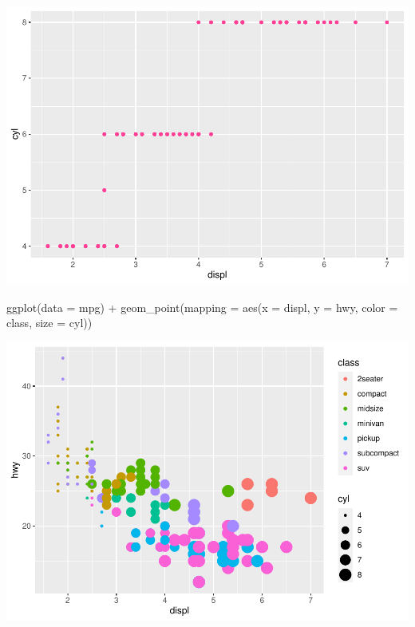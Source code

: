\documentclass[
]{article}
\newenvironment{Shaded}{\begin{snugshade}}{\end{snugshade}}
\newcommand{\AttributeTok}[1]{\textcolor[rgb]{0.77,0.63,0.00}{#1}}
\newcommand{\FunctionTok}[1]{\textcolor[rgb]{0.00,0.00,0.00}{#1}}
\newcommand{\NormalTok}[1]{#1}
\newcommand{\SpecialCharTok}[1]{\textcolor[rgb]{0.00,0.00,0.00}{#1}}
\begin{document}
\includegraphics{2_9_LiveCoding_files/figure-latex/unnamed-chunk-5-1.pdf}

\begin{Shaded}
\begin{Highlighting}[]
\FunctionTok{ggplot}\NormalTok{(}\AttributeTok{data =}\NormalTok{ mpg) }\SpecialCharTok{+} 
  \FunctionTok{geom\_point}\NormalTok{(}\AttributeTok{mapping =} \FunctionTok{aes}\NormalTok{(}\AttributeTok{x =}\NormalTok{ displ, }\AttributeTok{y =}\NormalTok{ hwy, }\AttributeTok{color =}\NormalTok{ class, }\AttributeTok{size =}\NormalTok{ cyl)) }
\end{Highlighting}
\end{Shaded}

\includegraphics{2_9_LiveCoding_files/figure-latex/unnamed-chunk-6-1.pdf}
\end{document}
